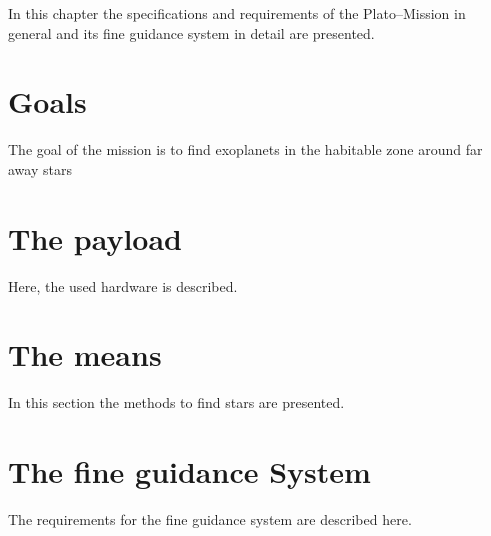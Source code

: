 In this chapter the specifications and requirements of the Plato--Mission in general and its fine guidance system in detail are presented.
\section{Goals}
The goal of the mission is to find exoplanets in the habitable zone around far away stars
\section{The payload}
Here, the used hardware is described.
\section{The means}
In this section the methods to find stars are presented. 
\section{The fine guidance System}
The requirements for the fine guidance system are described here.